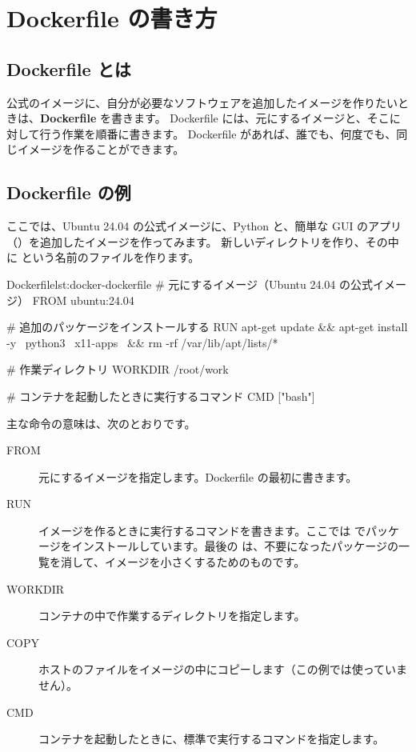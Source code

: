 \section{Dockerfile の書き方}
\label{sec:docker-dockerfile}

\subsection{Dockerfile とは}

公式のイメージに、自分が必要なソフトウェアを追加したイメージを作りたいときは、\textbf{Dockerfile} を書きます。
Dockerfile には、元にするイメージと、そこに対して行う作業を順番に書きます。
Dockerfile があれば、誰でも、何度でも、同じイメージを作ることができます。

\subsection{Dockerfile の例}

ここでは、Ubuntu 24.04 の公式イメージに、Python と、簡単な GUI のアプリ（）を追加したイメージを作ってみます。
新しいディレクトリを作り、その中に  という名前のファイルを作ります。


\begin{codelisting}[style=bash]{Dockerfile}{lst:docker-dockerfile}
# 元にするイメージ（Ubuntu 24.04 の公式イメージ）
FROM ubuntu:24.04

# 追加のパッケージをインストールする
RUN apt-get update && apt-get install -y \
    python3 \
    x11-apps \
    && rm -rf /var/lib/apt/lists/*

# 作業ディレクトリ
WORKDIR /root/work

# コンテナを起動したときに実行するコマンド
CMD ["bash"]
\end{codelisting}

主な命令の意味は、次のとおりです。

\begin{description}
  \item[FROM] 元にするイメージを指定します。Dockerfile の最初に書きます。
  \item[RUN] イメージを作るときに実行するコマンドを書きます。ここでは  でパッケージをインストールしています。最後の  は、不要になったパッケージの一覧を消して、イメージを小さくするためのものです。
  \item[WORKDIR] コンテナの中で作業するディレクトリを指定します。
  \item[COPY] ホストのファイルをイメージの中にコピーします（この例では使っていません）。
  \item[CMD] コンテナを起動したときに、標準で実行するコマンドを指定します。
\end{description}

